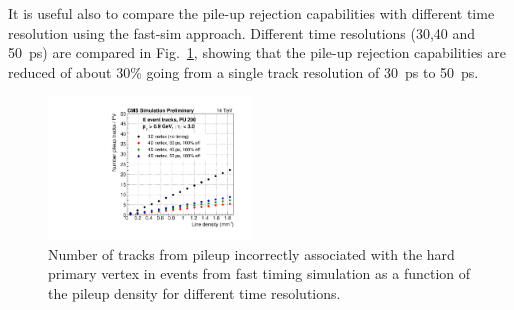 It is useful also to compare the pile-up rejection capabilities with different time resolution using the fast-sim approach. Different time resolutions (30,40 and 50~ps) are compared in Fig.~\ref{fig:purej_tres_comp}, showing that the pile-up rejection capabilities are reduced of about 30\% going from a single track resolution of 30~ps to 50~ps.

\begin{figure}[!phtb]
\centering
\includegraphics[width=0.48\textwidth]{fig/performance/purej/fastSim/nPUTracks_fromGenLevel_tres_eta3p0_pt0p9_2.pdf}
 \caption{Number of tracks from pileup incorrectly 
   associated with the hard primary vertex in \ttbar events from fast timing
   simulation as a function of the pileup density for different time resolutions.}
   \label{fig:purej_tres_comp}
\end{figure}
